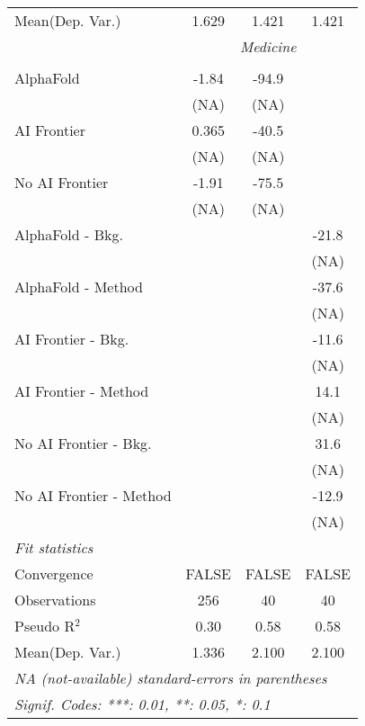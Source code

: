 \begin{tabular}{lccc}
Mean(Dep. Var.) & 1.629 & 1.421 & 1.421 \\
 & \multicolumn{3}{c}{\textit{Medicine}} \\ \\
   AlphaFold               & -1.84 & -94.9 &   \\   
                           & (NA)  & (NA)  &   \\   
   AI Frontier             & 0.365 & -40.5 &   \\   
                           & (NA)  & (NA)  &   \\   
   No AI Frontier          & -1.91 & -75.5 &   \\   
                           & (NA)  & (NA)  &   \\   
   AlphaFold - Bkg.        &       &       & -21.8\\   
                           &       &       & (NA)\\   
   AlphaFold - Method      &       &       & -37.6\\   
                           &       &       & (NA)\\   
   AI Frontier - Bkg.      &       &       & -11.6\\   
                           &       &       & (NA)\\   
   AI Frontier - Method    &       &       & 14.1\\   
                           &       &       & (NA)\\   
   No AI Frontier - Bkg.   &       &       & 31.6\\   
                           &       &       & (NA)\\   
   No AI Frontier - Method &       &       & -12.9\\   
                           &       &       & (NA)\\   
   \midrule
   \emph{Fit statistics}\\
   Convergence             &FALSE  & FALSE & FALSE\\  
   Observations            & 256   & 40    & 40\\  
   Pseudo R$^2$            & 0.30  & 0.58  & 0.58\\  
Mean(Dep. Var.) & 1.336 & 2.100 & 2.100 \\
   \midrule \midrule
   \multicolumn{4}{l}{\emph{NA (not-available) standard-errors in parentheses}}\\
   \multicolumn{4}{l}{\emph{Signif. Codes: ***: 0.01, **: 0.05, *: 0.1}}\\
\end{tabular}
\par\endgroup
